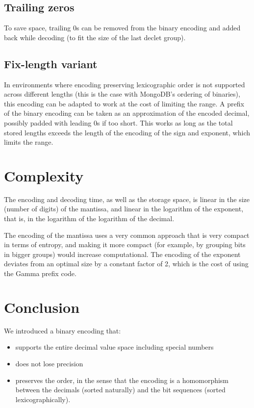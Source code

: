 \documentclass{acm_proc_article-sp}
\begin{document}
\subsection{Trailing zeros}

To save space, trailing 0s can be removed from the binary encoding and added back while decoding (to fit the size of the last declet group).

\subsection{Fix-length variant}

In environments where encoding preserving lexicographic order is not supported across different lengths (this is the case with MongoDB's ordering of binaries), this encoding can be adapted to work at the cost of limiting the range.
A prefix of the binary encoding can be taken as an approximation of the encoded decimal, possibly padded with leading 0s if too short. This works as long as the total stored lengths exceeds the length of the encoding of the sign and exponent, which limits the range.

\section{Complexity}
\label{section-complexity}
The encoding and decoding time, as well as the storage space, is linear in the size (number of digits) of the mantissa, and linear in the logarithm of the exponent, that is, in the logarithm of the logarithm of the decimal.

The encoding of the mantissa uses a very common approach that is very compact in terms of entropy, and making it more compact (for example, by grouping bits in bigger groups) would increase computational. The encoding of the exponent deviates from an optimal size by a constant factor of 2, which is the cost of using the Gamma prefix code.

\section{Conclusion}

We introduced a binary encoding that:
\begin{itemize}
\item supports the entire decimal value space including special numbers
\item does not lose precision
\item preserves the order, in the sense that the encoding is a homomorphism between the decimals (sorted naturally) and the bit sequences (sorted lexicographically).
\end{itemize}
\end{document}
